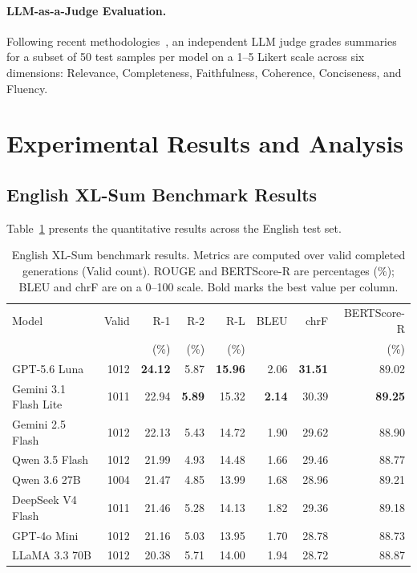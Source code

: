 \documentclass[runningheads]{llncs}
\begin{document}
\paragraph{LLM-as-a-Judge Evaluation.}
Following recent methodologies~\cite{zheng2023}, an independent LLM judge grades summaries for a subset of 50 test samples per model on a 1--5 Likert scale across six dimensions: Relevance, Completeness, Faithfulness, Coherence, Conciseness, and Fluency.

%
%
\section{Experimental Results and Analysis}\label{sec:results}

\subsection{English XL-Sum Benchmark Results}\label{subsec:english_results}

Table~\ref{tab:english_results} presents the quantitative results across the English test set.

\begin{table}[t]
\caption{English XL-Sum benchmark results. Metrics are computed over valid completed generations (Valid count). ROUGE and BERTScore-R are percentages (\%); BLEU and chrF are on a 0--100 scale. Bold marks the best value per column.}\label{tab:english_results}
\centering
\footnotesize
\begin{tabular}{p{3.2cm}rrrrrrr}
\toprule
Model & Valid & R-1 & R-2 & R-L & BLEU & chrF & BERTScore-R \\
 & & (\%) & (\%) & (\%) & & & (\%) \\
\midrule
GPT-5.6 Luna & 1012 & \textbf{24.12} & 5.87 & \textbf{15.96} & 2.06 & \textbf{31.51} & 89.02 \\
Gemini 3.1 Flash Lite & 1011 & 22.94 & \textbf{5.89} & 15.32 & \textbf{2.14} & 30.39 & \textbf{89.25} \\
Gemini 2.5 Flash & 1012 & 22.13 & 5.43 & 14.72 & 1.90 & 29.62 & 88.90 \\
Qwen 3.5 Flash & 1012 & 21.99 & 4.93 & 14.48 & 1.66 & 29.46 & 88.77 \\
Qwen 3.6 27B & 1004 & 21.47 & 4.85 & 13.99 & 1.68 & 28.96 & 89.21 \\
DeepSeek V4 Flash & 1011 & 21.46 & 5.28 & 14.13 & 1.82 & 29.36 & 89.18 \\
GPT-4o Mini & 1012 & 21.16 & 5.03 & 13.95 & 1.70 & 28.78 & 88.73 \\
LLaMA 3.3 70B & 1012 & 20.38 & 5.71 & 14.00 & 1.94 & 28.72 & 88.87 \\
\bottomrule
\end{tabular}
\end{table}
\end{document}
